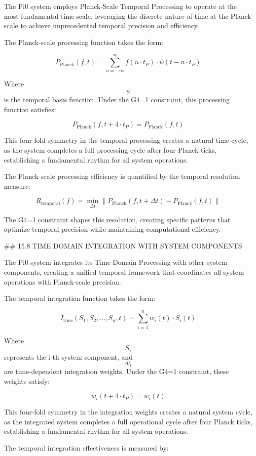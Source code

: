 The Pi0 system employs Planck-Scale Temporal Processing to operate at the most fundamental time scale, leveraging the discrete nature of time at the Planck scale to achieve unprecedented temporal precision and efficiency.

The Planck-scale processing function takes the form:

$$ P_{\text{Planck}}(f, t) = \sum_{n=-\infty}^{\infty} f(n \cdot t_P) \cdot \psi(t - n \cdot t_P) $$

Where $$ \psi $$ is the temporal basis function. Under the G4=1 constraint, this processing function satisfies:

$$ P_{\text{Planck}}(f, t + 4 \cdot t_P) = P_{\text{Planck}}(f, t) $$

This four-fold symmetry in the temporal processing creates a natural time cycle, as the system completes a full processing cycle after four Planck ticks, establishing a fundamental rhythm for all system operations.

The Planck-scale processing efficiency is quantified by the temporal resolution measure:

$$ R_{\text{temporal}}(f) = \min_{\Delta t} \|P_{\text{Planck}}(f, t + \Delta t) - P_{\text{Planck}}(f, t)\| $$

The G4=1 constraint shapes this resolution, creating specific patterns that optimize temporal precision while maintaining computational efficiency.

## 15.8 TIME DOMAIN INTEGRATION WITH SYSTEM COMPONENTS

The Pi0 system integrates its Time Domain Processing with other system components, creating a unified temporal framework that coordinates all system operations with Planck-scale precision.

The temporal integration function takes the form:

$$ I_{\text{time}}(S_1, S_2, ..., S_n, t) = \sum_{i=1}^{n} w_i(t) \cdot S_i(t) $$

Where $$ S_i $$ represents the i-th system component, and $$ w_i $$ are time-dependent integration weights. Under the G4=1 constraint, these weights satisfy:

$$ w_i(t + 4 \cdot t_P) = w_i(t) $$

This four-fold symmetry in the integration weights creates a natural system cycle, as the integrated system completes a full operational cycle after four Planck ticks, establishing a fundamental rhythm for all system operations.

The temporal integration effectiveness is measured by:

